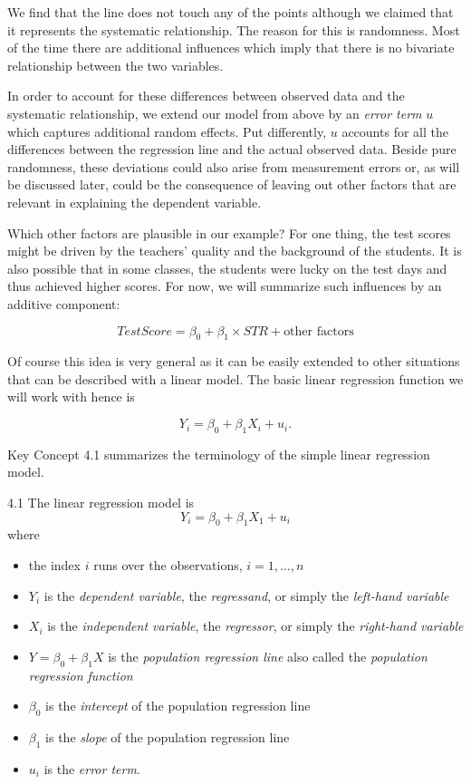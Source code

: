 \documentclass[]{book}
\theoremstyle{definition}
\theoremstyle{definition}
\theoremstyle{definition}
\theoremstyle{remark}
\begin{document}
We find that the line does not touch any of the points although we
claimed that it represents the systematic relationship. The reason for
this is randomness. Most of the time there are additional influences
which imply that there is no bivariate relationship between the two
variables.

In order to account for these differences between observed data and the
systematic relationship, we extend our model from above by an
\emph{error term} \(u\) which captures additional random effects. Put
differently, \(u\) accounts for all the differences between the
regression line and the actual observed data. Beside pure randomness,
these deviations could also arise from measurement errors or, as will be
discussed later, could be the consequence of leaving out other factors
that are relevant in explaining the dependent variable.

Which other factors are plausible in our example? For one thing, the
test scores might be driven by the teachers' quality and the background
of the students. It is also possible that in some classes, the students
were lucky on the test days and thus achieved higher scores. For now, we
will summarize such influences by an additive component:

\[ TestScore = \beta_0 + \beta_1 \times STR + \text{other factors} \]

Of course this idea is very general as it can be easily extended to
other situations that can be described with a linear model. The basic
linear regression function we will work with hence is

\[ Y_i = \beta_0 + \beta_1 X_i + u_i. \]

Key Concept 4.1 summarizes the terminology of the simple linear
regression model.

\begin{keyconcepts}{4.1}
The linear regression model is $$Y_i = \beta_0 + \beta_1 X_1 + u_i$$
where
\begin{itemize}
\item the index $i$ runs over the observations, $i=1,\dots,n$
\item $Y_i$ is the \textit{dependent variable}, the \textit{regressand}, or simply the \textit{left-hand variable}
\item $X_i$ is the \textit{independent variable}, the \textit{regressor}, or simply the \textit{right-hand variable}
\item $Y = \beta_0 + \beta_1 X$ is the \textit{population regression line} also called the \textit{population regression function}
\item $\beta_0$ is the \textit{intercept} of the population regression line
\item $\beta_1$ is the \textit{slope} of the population regression line
\item $u_i$ is the \textit{error term}.
\end{itemize}
\end{keyconcepts}
\end{document}
